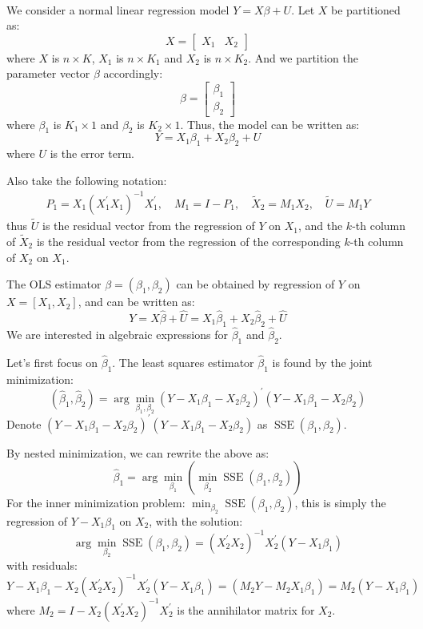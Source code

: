 \begin{definition}
    \

    We consider a normal linear regression model $Y = X \beta + U$.
    Let $X$ be partitioned as:
    \[X = \begin{bmatrix}
        X_1 & X_2
    \end{bmatrix}\]
    where $X$ is $n \times K$, $X_1$ is $n \times K_1$ and $X_2$ is $n \times K_2$.
    And we partition the parameter vector $\beta$ accordingly:
    \[\beta = \begin{bmatrix}
        \beta_1 \\
        \beta_2
    \end{bmatrix}\]
    where $\beta_1$ is $K_1 \times 1$ and $\beta_2$ is $K_2 \times 1$.
    Thus, the model can be written as:
    \[Y = X_1 \beta_1 + X_2 \beta_2 + U\]
    where $U$ is the error term.

    Also take the following notation:
    \begin{align*}
        P_1 = X_1 (X_1^{\prime} X_1)^{-1}X_1^{\prime}, \quad M_1 = I - P_1, \quad \tilde{X}_2 = M_1 X_2, \quad \tilde{U} = M_1 Y
    \end{align*}
    thus $\tilde{U}$ is the residual vector from the regression of $Y$ on $X_1$,
    and the $k$-th column of $\tilde{X}_2$ is the residual vector from the regression of the corresponding $k$-th column of $X_2$ on $X_1$.
\end{definition}

The OLS estimator $\beta = (\beta_1, \beta_2)$ can be obtained by regression of $Y$ on $X = [X_1, X_2]$, and can be written as:
\[
Y = X \hat{\beta} + \hat{U} = X_1 \hat{\beta}_1 + X_2 \hat{\beta}_2 + \hat{U}
\]
We are interested in algebraic expressions for $\hat{\beta}_1$ and $\hat{\beta}_2$.

Let's first focus on $\hat{\beta}_1$. The least squares estimator $\hat{\beta}_1$ is found by the joint minimization:
\[
(\hat{\beta}_1, \hat{\beta}_2) = \arg\min_{\beta_1, \beta_2} \left( Y - X_1 \beta_1 - X_2 \beta_2 \right)^{\prime} \left( Y - X_1 \beta_1 - X_2 \beta_2 \right)
\]
Denote $\left( Y - X_1 \beta_1 - X_2 \beta_2 \right)^{\prime} \left( Y - X_1 \beta_1 - X_2 \beta_2 \right)$ as $\operatorname{SSE}(\beta_1, \beta_2)$.

By nested minimization, we can rewrite the above as:
\[
\hat{\beta}_1 = \arg\min_{\beta_1} \left( \min_{\beta_2} \operatorname{SSE}(\beta_1, \beta_2) \right) 
\]
For the inner minimization problem: $\min_{\beta_2} \operatorname{SSE}(\beta_1, \beta_2)$,
this is simply the regression of $Y - X_1 \beta_1$ on $X_2$, with the solution:
\[
\arg\min_{\beta_2} \operatorname{SSE}(\beta_1, \beta_2)= (X_2^{\prime} X_2)^{-1} X_2^{\prime} (Y - X_1 \beta_1)
\]
with residuals:
\[
Y - X_1 \beta_1 - X_2 (X_2^{\prime} X_2)^{-1} X_2^{\prime} (Y - X_1 \beta_1) = (M_2 Y - M_2 X_1 \beta_1) = M_2 (Y - X_1 \beta_1)
\]
where $M_2 = I - X_2 (X_2^{\prime} X_2)^{-1} X_2^{\prime}$ is the annihilator matrix for $X_2$.

